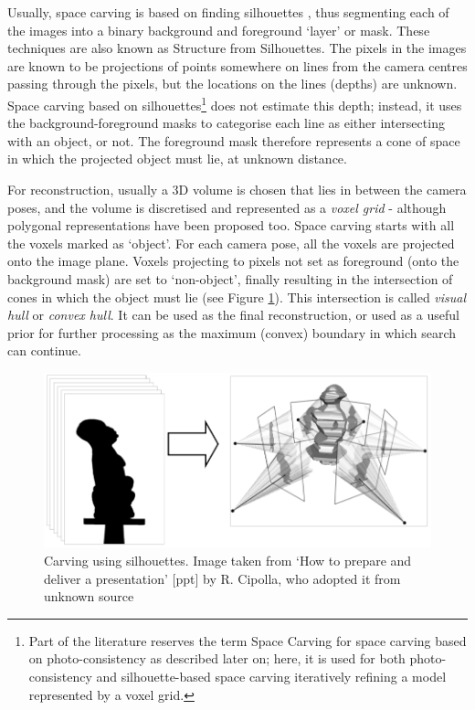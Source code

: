 Usually, space carving is based on finding silhouettes \cite{Hartley2003, Matusik2000}, thus segmenting each of the images into a binary background and foreground `layer' or mask. These techniques are also known as Structure from Silhouettes. The pixels in the images are known to be projections of points somewhere on lines from the camera centres passing through the pixels, but the locations on the lines (\ie depths) are unknown. Space carving based on silhouettes\footnote{Part of the literature reserves the term Space Carving for space carving based on photo-consistency as described later on; here, it is used for both photo-consistency and silhouette-based space carving iteratively refining a model represented by a voxel grid.} does not estimate this depth; instead, it uses the background-foreground masks to categorise each line as either intersecting with an object, or not. The foreground mask therefore represents a cone of space in which the projected object must lie, at unknown distance. 

For reconstruction, usually a 3D volume is chosen that lies in between the camera poses, and the volume is discretised and represented as a \emph{voxel grid} - although polygonal representations have been proposed too. Space carving starts with all the voxels marked as `object'. For each camera pose, all the voxels are projected onto the image plane. Voxels projecting to pixels not set as foreground (\ie onto the background mask) are set to `non-object', finally resulting in the intersection of cones in which the object must lie (see Figure \ref{fig:carving}). This intersection is called \emph{visual hull} or \emph{convex hull}. It can be used as the final reconstruction, or used as a useful prior for further processing as the maximum (convex) boundary in which search can continue.

\begin{figure}[htb!]
 \centering
 \includegraphics[width=1.0\textwidth]{img/carving}
 \caption{Carving using silhouettes. Image taken from `How to prepare and deliver a presentation' [ppt] by R. Cipolla, who adopted it from unknown source}
 \label{fig:carving}
\end{figure}

